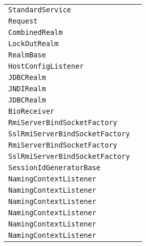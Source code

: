 \begin{center}
\begin{tabular}{ll}
\lstinline/StandardService/&\raisebox{0pt}{\lstinline/ stopInternal())/}\\ 
\lstinline/Request/&\raisebox{0pt}{\lstinline/ PrincipalgetUserPrincipal()/}\\ 
\lstinline/CombinedRealm/&\raisebox{0pt}{\lstinline/ PrincipalgetPrincipal(String)/}\\ 
\lstinline/LockOutRealm/&\raisebox{0pt}{\lstinline/ PrincipalfilterLockedAccounts(String)/}\\ 
\lstinline/RealmBase/&\raisebox{0pt}{\lstinline/ StringDigest(String,String,String)/}\\ 
\lstinline/HostConfigListener/&\raisebox{0pt}{\lstinline/ checkUndeploy()/}\\ 
\lstinline/JDBCRealm/&\raisebox{0pt}{\lstinline/ startInternal())/}\\ 
\lstinline/JNDIRealm/&\raisebox{0pt}{\lstinline/ startInternal())/}\\ 
\lstinline/JDBCRealm/&\raisebox{0pt}{\lstinline/ startInternal())/}\\ 
\lstinline/BioReceiver/&\raisebox{0pt}{\lstinline/ listen())/}\\ 
\lstinline/RmiServerBindSocketFactory/&\raisebox{0pt}{\lstinline/ RmiServerBindSocketFactory(String)/}\\ 
\lstinline/SslRmiServerBindSocketFactory/&\raisebox{0pt}{\lstinline/ SslRmiServerBindSocketFactory(String[])/}\\ 
\lstinline/RmiServerBindSocketFactory/&\raisebox{0pt}{\lstinline/ RmiServerBindSocketFactory(String)/}\\ 
\lstinline/SslRmiServerBindSocketFactory/&\raisebox{0pt}{\lstinline/ SslRmiServerBindSocketFactory(String[])/}\\ 
\lstinline/SessionIdGeneratorBase/&\raisebox{0pt}{\lstinline/ SecureRandomcreateSecureRandom()/}\\ 
\lstinline/NamingContextListener/&\raisebox{0pt}{\lstinline/ removeResourceLink(String)/}\\ 
\lstinline/NamingContextListener/&\raisebox{0pt}{\lstinline/ removeResourceLink(String)/}\\ 
\lstinline/NamingContextListener/&\raisebox{0pt}{\lstinline/ removeResourceLink(String)/}\\ 
\lstinline/NamingContextListener/&\raisebox{0pt}{\lstinline/ removeResourceLink(String)/}\\ 
\lstinline/NamingContextListener/&\raisebox{0pt}{\lstinline/ removeResourceLink(String)/}\\ 
\lstinline/NamingContextListener/&\raisebox{0pt}{\lstinline/ removeResourceLink(String)/}\\ 

\end{tabular}
\end{center}
